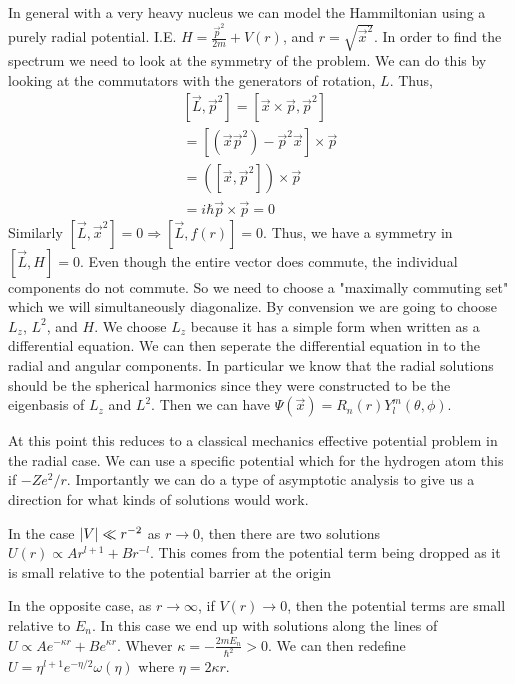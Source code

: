 In general with a very heavy nucleus we can model the Hammiltonian
using a purely radial potential. I.E. 
$H = \frac{\vec{p}^2}{2m} + V(r)$, and $r = \sqrt{\vec{x}^2}$. In
order to find the spectrum we need to look at the symmetry of the problem.
We can do this by looking at the commutators with the generators of
rotation, $L$. Thus,
\begin{gather*}
    \left[\vec{L}, \vec{p}^2\right] = \left[\vec{x}\times\vec{p}, \vec{p}^2\right] \\
    = \left[\left(\vec{x} \vec{p}^2\right) - \vec{p}^2 \vec{x}\right] \times \vec{p} \\
    = \left(\left[\vec{x}, \vec{p}^2\right]\right) \times \vec{p} \\
    = i \hbar \vec{p} \times \vec{p} =0
\end{gather*}
Similarly $\left[\vec{L}, \vec{x}^2\right] = 0 \Rightarrow \left[\vec{L}, f(r)\right] = 0$.
Thus, we have a symmetry in $\left[\vec{L}, H\right] = 0$. Even though the entire
vector does commute, the individual components do not commute. So we need to choose
a "maximally commuting set" which we will simultaneously diagonalize. By convension
we are going to choose $L_z$, $L^2$, and $H$. We choose $L_z$ because it has
a simple form when written as a differential equation. We can then
seperate the differential equation in to the radial and angular components. In
particular we know that the radial solutions should be the spherical harmonics since
they were constructed to be the eigenbasis of $L_z$ and $L^2$.
Then we can have $\Psi(\vec{x}) = R_n(r) Y_l^m(\theta, \phi)$.

At this point this reduces to a classical mechanics effective potential problem
in the radial case. We can use a specific potential which for the hydrogen atom
this if $-Z e^2 /r$. Importantly we can do a type of asymptotic analysis to give
us a direction for what kinds of solutions would work. 

In the case $\abs*{V} \ll r^{-2}$
as $r \to 0$, then there are two solutions
$U(r) \propto A r^{l+1} + B r^{-l}$. This comes from the potential term being
dropped as it is small relative to the potential barrier at the origin

In the opposite case, as $r \to \infty$,
if $V(r) \to 0$, then the potential terms are small relative to $E_n$.
In this case we end up with solutions along the lines of
$U \propto A e^{-\kappa r} + B e^{\kappa r}$. Whever $\kappa = - \frac{2m E_n}{\hbar^2} > 0$.
We can then redefine $U = \eta^{l + 1} e^{-\eta /2} \omega(\eta)$ where
$\eta = 2 \kappa r$.
